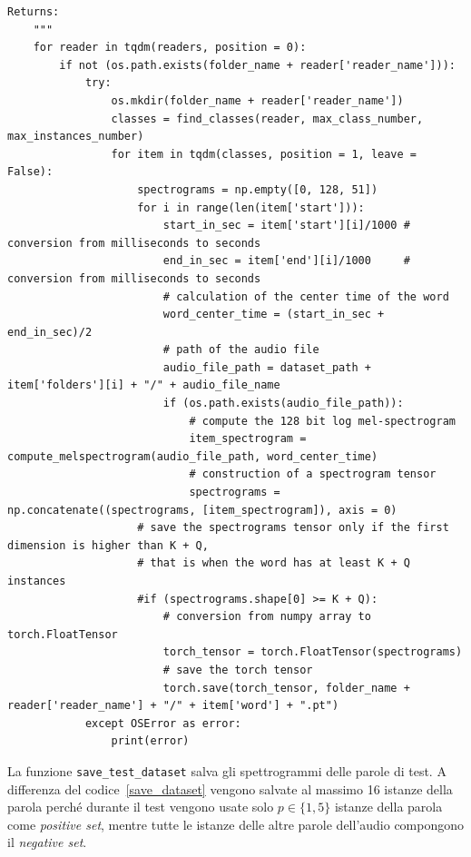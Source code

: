 \documentclass[12pt,a4paper,titlepage]{article}
\begin{document}
\begin{lstlisting}[language=iPython,firstnumber=10, caption=Funzione \texttt{save\_dataset}, label=save_dataset,captionpos=b]
    Returns:
    """
    for reader in tqdm(readers, position = 0):
        if not (os.path.exists(folder_name + reader['reader_name'])):
            try:
                os.mkdir(folder_name + reader['reader_name'])
                classes = find_classes(reader, max_class_number, max_instances_number)
                for item in tqdm(classes, position = 1, leave = False):
                    spectrograms = np.empty([0, 128, 51])
                    for i in range(len(item['start'])):
                        start_in_sec = item['start'][i]/1000 # conversion from milliseconds to seconds
                        end_in_sec = item['end'][i]/1000     # conversion from milliseconds to seconds
                        # calculation of the center time of the word
                        word_center_time = (start_in_sec + end_in_sec)/2
                        # path of the audio file
                        audio_file_path = dataset_path + item['folders'][i] + "/" + audio_file_name
                        if (os.path.exists(audio_file_path)):
                            # compute the 128 bit log mel-spectrogram
                            item_spectrogram = compute_melspectrogram(audio_file_path, word_center_time)
                            # construction of a spectrogram tensor
                            spectrograms = np.concatenate((spectrograms, [item_spectrogram]), axis = 0)
                    # save the spectrograms tensor only if the first dimension is higher than K + Q, 
                    # that is when the word has at least K + Q instances
                    #if (spectrograms.shape[0] >= K + Q):
                        # conversion from numpy array to torch.FloatTensor
                        torch_tensor = torch.FloatTensor(spectrograms)
                        # save the torch tensor
                        torch.save(torch_tensor, folder_name + reader['reader_name'] + "/" + item['word'] + ".pt")
            except OSError as error:
                print(error)   
\end{lstlisting}

La funzione \texttt{save\_test\_dataset} salva gli spettrogrammi delle parole di test. A differenza del codice~\ref{save_dataset} vengono salvate al massimo 16 istanze della parola perché durante il test vengono usate solo $p \in \{1, 5\}$ istanze della parola come \emph{positive set}, mentre tutte le istanze delle altre parole dell'audio compongono il \emph{negative set}.
\end{document}
